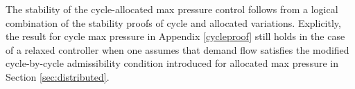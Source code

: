 The stability of the cycle-allocated max pressure control follows from a logical combination of the stability proofs of cycle and allocated variations. Explicitly, the result for cycle max pressure in Appendix \ref{cycleproof} still holds in the case of a relaxed controller when one assumes that demand flow satisfies the modified cycle-by-cycle admissibility condition introduced for allocated max pressure in Section \ref{sec:distributed}. 
%
%
%
